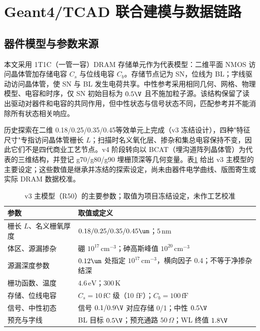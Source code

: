 \section{Geant4/TCAD 联合建模与数据链路}

\subsection{器件模型与参数来源}

本文采用 1T1C（一管一容）DRAM 存储单元作为代表模型：二维平面 NMOS 访问晶体管加存储电容 $C_s$ 与位线电容 $C_b$。存储节点记为 SN，位线为 BL；字线驱动访问晶体管，使 SN 与 BL 发生电荷共享。中性参考采用相同几何、网格、物理模型、电容和时序，仅 SN 初始目标为 $0.5\V$ 且不施加粒子源。该结构保留了读出驱动对器件和电容的共同作用，但中性状态与信号状态不同，匹配参考并不能消除所有状态相关响应。

历史探索在二维 0.18/0.25/0.35/0.45\um 等效单元上完成（v3 冻结设计），四种"特征尺寸"专指访问晶体管栅长 $L$；扫描时名义氧化层、掺杂和集总电容保持不变，因此它们不是四代商业工艺节点。v4 阶段转向以 BCAT（埋沟道阵列晶体管）为代表的三维结构，并登记 g70/g80/g90 埋栅顶深等几何变量。表\ref{tab:parameters} 给出 v3 主模型的主要设定；这些数值是继承并冻结的探索设定，尚未由器件电学曲线、版图寄生或实际 DRAM 数据校准。

\begin{table}[htbp]
\centering\small
\caption{v3 主模型（R50）的主要参数；取值为项目冻结设定，未作工艺校准}
\label{tab:parameters}
\begin{tabularx}{\textwidth}{@{}p{3.6cm}X@{}}
\toprule
参数 & 取值或定义\\
\midrule
栅长 $L$、名义栅氧厚度 & $0.18/0.25/0.35/0.45\um$；$5\,\text{nm}$\\
体区、源漏掺杂 & 硼 $10^{17}\,\text{cm}^{-3}$；砷高斯峰值 $10^{20}\,\text{cm}^{-3}$\\
源漏深度参数 & $0.12\um$ 处指定 $10^{17}\,\text{cm}^{-3}$，横向因子 0.4；不等于净掺杂结深\\
栅功函数、温度 & $4.6\,\text{eV}$；$300\,\text{K}$\\
存储、位线电容 & $C_s=10\,\text{fC}$ 级（10 fF）；$C_b=100\,\text{fF}$\\
信号、中性初态 & 信号 $0.1/0.9\V$ 对应存储 0/1；中性 $0.5\V$\\
预充与字线 & BL 目标 $0.5\V$；预充通路 $50\,\Omega$；WL 终值 $1.8\V$\\
\bottomrule
\end{tabularx}
\end{table}

